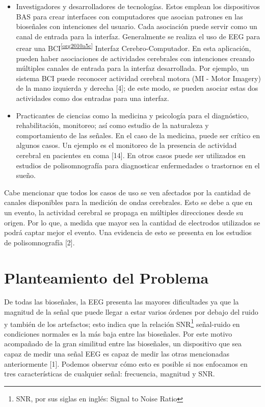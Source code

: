 \begin{itemize}
\item Investigadores y desarrolladores de tecnologías. Estos emplean los dispositivos BAS para crear interfaces con computadores que asocian patrones en las bioseñales con intenciones del usuario. Cada asociación puede servir como un canal de entrada para la interfaz. Generalmente se realiza el uso de EEG para crear una BCI\textsuperscript{\ref{org2010a5c}} Interfaz Cerebro-Computador. En esta aplicación, pueden haber asociaciones de actividades cerebrales con intenciones creando múltiples canales de entrada para la interfaz desarrollada. Por ejemplo, un sistema BCI puede reconocer actividad cerebral motora (MI - Motor Imagery) de la mano izquierda y derecha [4]; de este modo, se pueden asociar estas dos actividades como dos entradas para una interfaz.

\item Practicantes de ciencias como la medicina y psicología para el diagnóstico, rehabilitación, monitoreo; así como estudio de la naturaleza y comportamiento de las señales. En el caso de la medicina, puede ser crítico en algunos casos. Un ejemplo es el monitoreo de la presencia de actividad cerebral en pacientes en coma [14]. En otros casos puede ser utilizados en estudios de polisomnografía para diagnosticar enfermedades o trastornos en el sueño.
\end{itemize}

Cabe mencionar que todos los casos de uso se ven afectados por la cantidad de canales disponibles para la medición de ondas cerebrales. Esto se debe a que en un evento, la actividad cerebral se propaga en múltiples direcciones desde su origen. Por lo que, a medida que mayor sea la cantidad de electrodos utilizados se podrá captar mejor el evento. Una evidencia de esto se presenta en los estudios de polisomnografía \cite{Bubrick2014} [2].

\section{Planteamiento del Problema}
\label{sec:org3aff47d}
De todas las bioseñales, la EEG presenta las mayores dificultades ya que la magnitud de la señal que puede llegar a estar varios órdenes por debajo del ruido y también de los artefactos; esto indica que la relación SNR\footnote{SNR, por sus siglas en inglés: Signal to Noise Ratio} señal-ruido en condiciones normales es la más baja entre las bioseñales. Por este motivo acompañado de la gran similitud entre las bioseñales, un dispositivo que sea capaz de medir una señal EEG es capaz de medir las otras mencionadas anteriormente [1]. Podemos observar cómo esto es posible si nos enfocamos en tres características de cualquier señal: frecuencia, magnitud y SNR.

